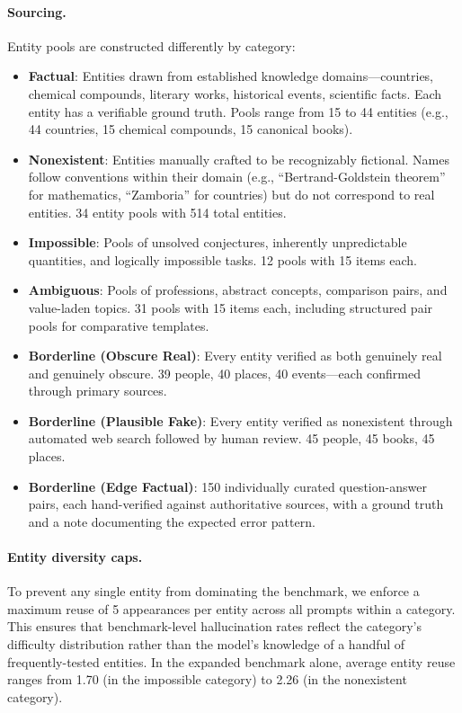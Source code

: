 \paragraph{Sourcing.} Entity pools are constructed differently by category:
\begin{itemize}
    \item \textbf{Factual}: Entities drawn from established knowledge domains---countries, chemical compounds, literary works, historical events, scientific facts. Each entity has a verifiable ground truth. Pools range from 15 to 44 entities (e.g., 44 countries, 15 chemical compounds, 15 canonical books).
    \item \textbf{Nonexistent}: Entities manually crafted to be recognizably fictional. Names follow conventions within their domain (e.g., ``Bertrand-Goldstein theorem'' for mathematics, ``Zamboria'' for countries) but do not correspond to real entities. 34 entity pools with 514 total entities.
    \item \textbf{Impossible}: Pools of unsolved conjectures, inherently unpredictable quantities, and logically impossible tasks. 12 pools with 15 items each.
    \item \textbf{Ambiguous}: Pools of professions, abstract concepts, comparison pairs, and value-laden topics. 31 pools with 15 items each, including structured pair pools for comparative templates.
    \item \textbf{Borderline (Obscure Real)}: Every entity verified as both genuinely real and genuinely obscure. 39 people, 40 places, 40 events---each confirmed through primary sources.
    \item \textbf{Borderline (Plausible Fake)}: Every entity verified as nonexistent through automated web search followed by human review. 45 people, 45 books, 45 places.
    \item \textbf{Borderline (Edge Factual)}: 150 individually curated question-answer pairs, each hand-verified against authoritative sources, with a ground truth and a note documenting the expected error pattern.
\end{itemize}

\paragraph{Entity diversity caps.} To prevent any single entity from dominating the benchmark, we enforce a maximum reuse of 5 appearances per entity across all prompts within a category. This ensures that benchmark-level hallucination rates reflect the category's difficulty distribution rather than the model's knowledge of a handful of frequently-tested entities. In the expanded benchmark alone, average entity reuse ranges from 1.70 (in the impossible category) to 2.26 (in the nonexistent category).

